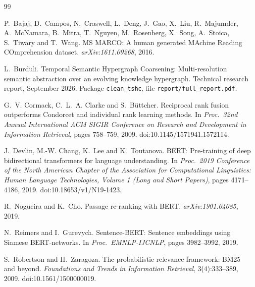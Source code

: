 \documentclass[11pt,a4paper]{article}
\theoremstyle{remark}
\begin{document}
\begin{thebibliography}{99}
\setlength{\itemsep}{3pt}
\small

P.~Bajaj, D.~Campos, N.~Craswell, L.~Deng, J.~Gao, X.~Liu, R.~Majumder, A.~McNamara,
B.~Mitra, T.~Nguyen, M.~Rosenberg, X.~Song, A.~Stoica, S.~Tiwary and T.~Wang.
\newblock MS MARCO: A human generated MAchine Reading COmprehension dataset.
\newblock \emph{arXiv:1611.09268}, 2016.

L.~Burduli.
\newblock Temporal Semantic Hypergraph Coarsening: Multi-resolution semantic abstraction
over an evolving knowledge hypergraph.
\newblock Technical research report, September 2026. Package \texttt{clean\_tshc},
file \texttt{report/full\_report.pdf}.

G.~V. Cormack, C.~L.~A. Clarke and S.~B\"uttcher.
\newblock Reciprocal rank fusion outperforms Condorcet and individual rank learning methods.
\newblock In \emph{Proc.\ 32nd Annual International ACM SIGIR Conference on Research and
Development in Information Retrieval}, pages 758--759, 2009.
\newblock doi:10.1145/1571941.1572114.

J.~Devlin, M.-W. Chang, K.~Lee and K.~Toutanova.
\newblock BERT: Pre-training of deep bidirectional transformers for language understanding.
\newblock In \emph{Proc.\ 2019 Conference of the North American Chapter of the Association
for Computational Linguistics: Human Language Technologies, Volume 1 (Long and Short
Papers)}, pages 4171--4186, 2019.
\newblock doi:10.18653/v1/N19-1423.

R.~Nogueira and K.~Cho.
\newblock Passage re-ranking with BERT.
\newblock \emph{arXiv:1901.04085}, 2019.

N.~Reimers and I.~Gurevych.
\newblock Sentence-BERT: Sentence embeddings using Siamese BERT-networks.
\newblock In \emph{Proc.\ EMNLP-IJCNLP}, pages 3982--3992, 2019.

S.~Robertson and H.~Zaragoza.
\newblock The probabilistic relevance framework: BM25 and beyond.
\newblock \emph{Foundations and Trends in Information Retrieval}, 3(4):333--389, 2009.
\newblock doi:10.1561/1500000019.


\end{thebibliography}
\end{document}
